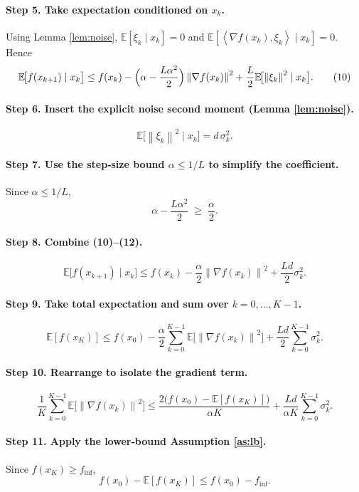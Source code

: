 \documentclass[11pt]{article}
\newcommand{\EE}{\mathbb{E}}
\newcommand{\norm}[1]{\left\lVert#1\right\rVert}
\newcommand{\inner}[2]{\left\langle #1,#2\right\rangle}
\begin{document}
\paragraph{Step 5. Take expectation conditioned on $x_{k}$.}
Using Lemma \ref{lem:noise}, $\EE[\xi_{k}\mid x_{k}]=0$ and $\EE[\inner{\nabla f(x_{k})}{\xi_{k}}\mid x_{k}]=0$. Hence
\[
\EE\!\bigl[f(x_{k+1})\mid x_{k}\bigr]
\le f(x_{k})
-\Bigl(\alpha-\frac{L\alpha^{2}}{2}\Bigr)\norm{\nabla f(x_{k})}^{2}
+\frac{L}{2}\EE\!\bigl[\norm{\xi_{k}}^{2}\mid x_{k}\bigr].
\tag{10}
\]

\paragraph{Step 6. Insert the explicit noise second moment (Lemma \ref{lem:noise}).}
\[
\EE\!\bigl[\norm{\xi_{k}}^{2}\mid x_{k}\bigr]=d\,\sigma_{k}^{2}.
\tag{11}
\]

\paragraph{Step 7. Use the step‑size bound $\alpha\le 1/L$ to simplify the coefficient.}
Since $\alpha\le 1/L$,
\[
\alpha-\frac{L\alpha^{2}}{2}
\;\ge\;\frac{\alpha}{2}.
\tag{12}
\]

\paragraph{Step 8. Combine (10)–(12).}
\[
\EE\!\bigl[f(x_{k+1})\mid x_{k}\bigr]
\le f(x_{k})-\frac{\alpha}{2}\norm{\nabla f(x_{k})}^{2}
+\frac{L d}{2}\sigma_{k}^{2}.
\tag{13}
\]

\paragraph{Step 9. Take total expectation and sum over $k=0,\dots,K-1$.}
\[
\EE[f(x_{K})]
\le f(x_{0})
-\frac{\alpha}{2}\sum_{k=0}^{K-1}\EE\!\bigl[\norm{\nabla f(x_{k})}^{2}\bigr]
+\frac{L d}{2}\sum_{k=0}^{K-1}\sigma_{k}^{2}.
\tag{14}
\]

\paragraph{Step 10. Rearrange to isolate the gradient term.}
\[
\frac{1}{K}\sum_{k=0}^{K-1}\EE\!\bigl[\norm{\nabla f(x_{k})}^{2}\bigr]
\le
\frac{2\bigl(f(x_{0})-\EE[f(x_{K})]\bigr)}{\alpha K}
+\frac{L d}{\alpha K}\sum_{k=0}^{K-1}\sigma_{k}^{2}.
\tag{15}
\]

\paragraph{Step 11. Apply the lower‑bound Assumption \ref{as:lb}.}
Since $f(x_{K})\ge f_{\inf}$,
\[
f(x_{0})-\EE[f(x_{K})]\le f(x_{0})-f_{\inf}.
\tag{16}
\]
\end{document}
